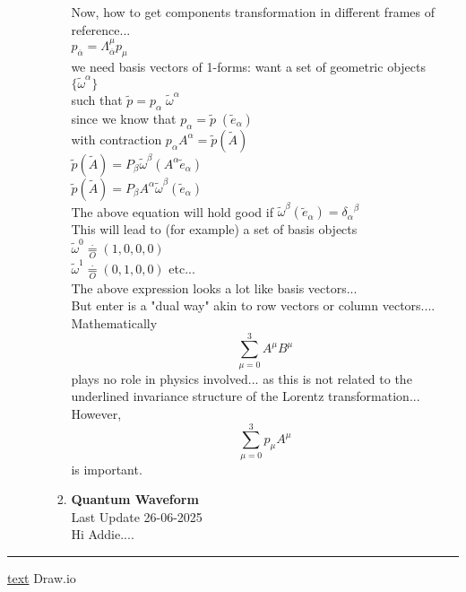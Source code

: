 \documentclass[11pt,a4paper]{article}
\begin{document}
\begin{enumerate}
\begin{enumerate}
\begin{enumerate}
			                  Now, how to get components transformation in different frames of reference...\\
			                  $p_{\overline{\alpha}} = \Lambda^{\mu}_{\overline{\alpha}} p_{\mu}$\\
			                  we need basis vectors of 1-forms: want a set of geometric objects\\
			                  $\{ \tilde{\omega}^\alpha\}$\\ such that $ \tilde{p}= p_\alpha\; \tilde{\omega}^\alpha$\\
			                  since we know that $p_\alpha = \widetilde{p}\; (\widetilde{e}_\alpha)$\\
			                  with contraction $p_\alpha A^\alpha = \widetilde{p} (\widetilde{A})$\\
			                  $\widetilde{p} (\widetilde{A}) = P_\beta \tilde{\omega}^\beta ( A^\alpha \tilde{e}_\alpha )$\\
			                  $\widetilde{p} (\widetilde{A}) = P_\beta A^\alpha \tilde{\omega}^\beta ( \tilde{e}_\alpha )$\\
			                  The above equation will hold good if $\tilde{\omega}^\beta ( \tilde{e}_\alpha ) = {\delta_\alpha}^\beta $\\
			                  This will lead to (for example) a set of basis objects\\
			                  $\tilde{\omega}^0 \mathop = \limits^{\cdot}_{O} (1,0,0,0)$\\
			                  $\tilde{\omega}^1 \mathop = \limits^{\cdot}_{O} (0,1,0,0)$ etc...\\
			                  The above expression looks a lot like basis vectors...\\
			                  But enter is a "dual way" akin to row vectors or column vectors....\\
			                  Mathematically \[ \sum_{\mu=0}^{3}A^\mu B^\mu \] plays no role in physics involved... as this is not related to the underlined invariance structure of the Lorentz transformation...\\
			                  However, \[ \sum_{\mu=0}^{3} p_\mu A^\mu\] is important.\\
			            \item \textbf{Quantum Waveform}\\



			                  Last Update 26-06-2025\\
			                  Hi Addie....\\
		            \end{enumerate}
	      \end{enumerate}
\end{enumerate}
\noindent\rule{\textwidth}{1pt}
\href{https://youtu.be/TiHHz3sKDbY?list=PL6Q1107aDr%SgQ1DBEugejXLfQX76hfSnX&t=1188}{text} Draw.io
\end{document}
